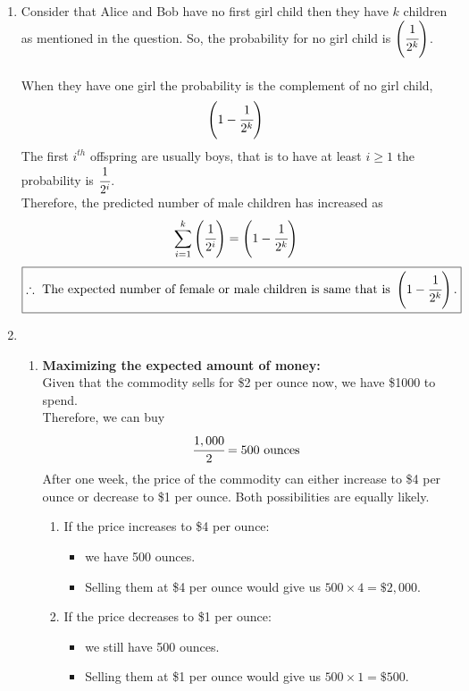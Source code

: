 \documentclass{article}
\begin{document}
\begin{enumerate}
\item 
    Consider that Alice and Bob have no first girl child then they have \(k\) children as mentioned in the question. So, the probability for no girl child is \( \left(\cfrac{1}{2^k}\right)\).\\\\
    When they have one girl the probability is the complement of no girl child,\\
    \[
    \left(1 - \cfrac{1}{2^k}\right)
    \]
    The first \( i^{th} \) offspring are usually boys, that is to have at least \( i \geq 1 \) the probability is \( \cfrac{1}{2^i} \).\\
    Therefore, the predicted number of male children has increased as
    \[
    \sum_{i=1}^k \left(\cfrac{1}{2^i}\right) = \left(1 - \cfrac{1}{2^k}\right)
    \]
    \[
        \boxed{\therefore\ \textnormal{The expected number of female or male children is same that is } \left(1 - \cfrac{1}{2^k}\right).}
    \]
\newpage
\item 
\begin{enumerate}
    \item 
    \textbf{Maximizing the expected amount of money:}\\
    Given that the commodity sells for \$2 per ounce now, we have \$1000 to spend. \\
    Therefore, we can buy 
    \[ 
    \cfrac{1,000}{2} = 500 \text{ ounces}
    \]
    After one week, the price of the commodity can either increase to \$4 per ounce or decrease to \$1 per ounce. Both possibilities are equally likely.\\
    \begin{enumerate}
        \item If the price increases to \$4 per ounce:
        \begin{itemize}
            \item we have 500 ounces.
            \item Selling them at \$4 per ounce would give us \( 500 \times 4 = \$2,000. \)
        \end{itemize}
        \item If the price decreases to \$1 per ounce:
        \begin{itemize}
            \item we still have 500 ounces.
            \item Selling them at \$1 per ounce would give us \( 500 \times 1 = \$500. \)
        \end{itemize}

\end{enumerate}
\end{enumerate}
\end{enumerate}
\end{document}
